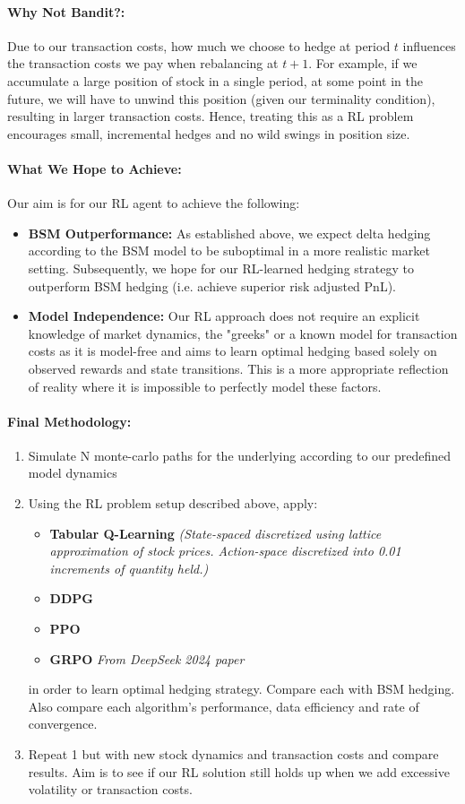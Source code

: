 \documentclass{article}
\begin{document}
\paragraph{Why Not Bandit?:} Due to our transaction costs, how much we choose to hedge at period $t$ influences the transaction costs we pay when rebalancing at $t+1$. For example, if we accumulate a large position of stock in a single period, at some point in the future, we will have to unwind this position (given our terminality condition), resulting in larger transaction costs. Hence, treating this as a RL problem encourages small, incremental hedges and no wild swings in position size.

\paragraph{What We Hope to Achieve:} Our aim is for our RL agent to achieve the following:
\begin{itemize}
    \item \textbf{BSM Outperformance:} As established above, we expect delta hedging according to the BSM model to be suboptimal in a more realistic market setting. Subsequently, we hope for our RL-learned hedging strategy to outperform BSM hedging (i.e. achieve superior risk adjusted PnL).
    \item \textbf{Model Independence:} Our RL approach does not require an explicit knowledge of market dynamics, the "greeks" or a known model for transaction costs as it is model-free and aims to learn optimal hedging based solely on observed rewards and state transitions. This is a more appropriate reflection of reality where it is impossible to perfectly model these factors.
\end{itemize}

\paragraph{Final Methodology:} 
\begin{enumerate}
    \item Simulate N monte-carlo paths for the underlying according to our predefined model dynamics
    \item Using the RL problem setup described above, apply:
    \begin{itemize}
        \item \textbf{Tabular Q-Learning} \textit{(State-spaced discretized using lattice approximation of stock prices. Action-space discretized into 0.01 increments of quantity held.)}
        \item \textbf{DDPG}
        \item \textbf{PPO}
        \item \textbf{GRPO} \textit{From DeepSeek 2024 paper}
    \end{itemize}
    in order to learn optimal hedging strategy. Compare each with BSM hedging. Also compare each algorithm's performance, data efficiency and rate of convergence.
    \item Repeat 1 but with new stock dynamics and transaction costs and compare results. Aim is to see if our RL solution still holds up when we add excessive volatility or transaction costs.
\end{enumerate}
\end{document}
